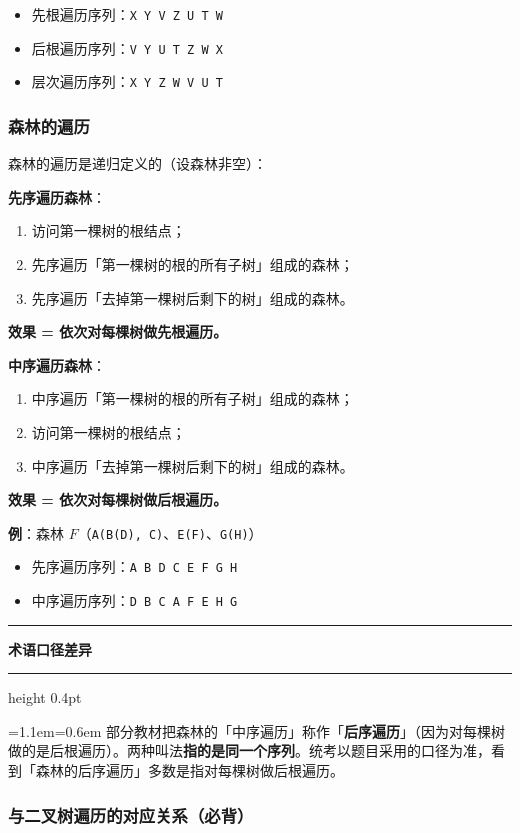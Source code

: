 \documentclass[11pt,openany,UTF8]{ctexbook}
\newcommand{\callouthead}[2]{%
  \par\addvspace{7pt}\noindent
  {\color{#1}\rule[-0.15em]{3pt}{1.05em}}\hspace{0.5em}%
  {\bfseries\color{#1}#2}\par\nobreak\vspace{-0.35em}%
  {\color{rulesep}\hrule height 0.4pt}\nobreak\vspace{0.45em}%
  \begingroup\small\setlength{\parindent}{0pt}%
  \leftskip=1.1em\rightskip=0.6em\noindent\ignorespaces}
\newcommand{\calloutend}{\par\endgroup\addvspace{7pt}}
\newenvironment{callwarn}[1]{\callouthead{warnbar}{#1}}{\calloutend}
\begin{document}
\begin{itemize}
\item 先根遍历序列：\texttt{X Y V Z U T W}
\item 后根遍历序列：\texttt{V Y U T Z W X}
\item 层次遍历序列：\texttt{X Y Z W V U T}
\end{itemize}
\subsubsection{森林的遍历}

森林的遍历是递归定义的（设森林非空）：

\textbf{先序遍历森林}：

\begin{enumerate}
\item 访问第一棵树的根结点；
\item 先序遍历「第一棵树的根的所有子树」组成的森林；
\item 先序遍历「去掉第一棵树后剩下的树」组成的森林。
\end{enumerate}
\textbf{效果 = 依次对每棵树做先根遍历。}

\textbf{中序遍历森林}：

\begin{enumerate}
\item 中序遍历「第一棵树的根的所有子树」组成的森林；
\item 访问第一棵树的根结点；
\item 中序遍历「去掉第一棵树后剩下的树」组成的森林。
\end{enumerate}
\textbf{效果 = 依次对每棵树做后根遍历。}

\textbf{例}：森林 $F$（\texttt{A(B(D)\allowbreak{},\allowbreak{} C)\allowbreak{}}、\texttt{E(F)\allowbreak{}}、\texttt{G(H)\allowbreak{}}）

\begin{itemize}
\item 先序遍历序列：\texttt{A B D C E F G H}
\item 中序遍历序列：\texttt{D B C A F E H G}
\end{itemize}
\begin{callwarn}{术语口径差异}
部分教材把森林的「中序遍历」称作「\textbf{后序遍历}」（因为对每棵树做的是后根遍历）。两种叫法\textbf{指的是同一个序列}。统考以题目采用的口径为准，看到「森林的后序遍历」多数是指对每棵树做后根遍历。

\end{callwarn}

\subsubsection{与二叉树遍历的对应关系（必背）}
\end{document}
